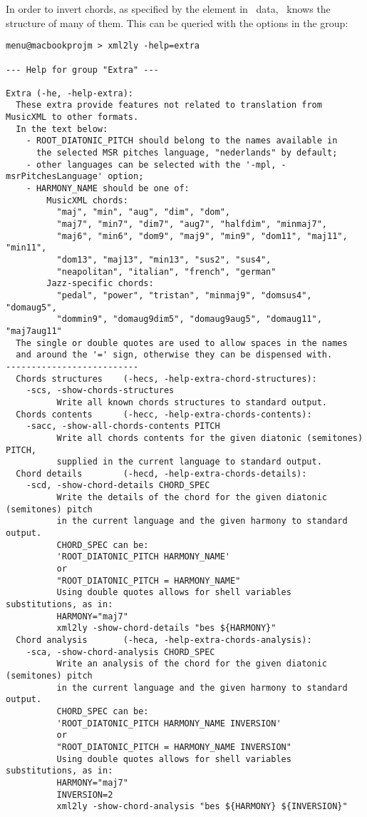 In order to invert chords, as specified by the  element in \mxml\ data, \mxmlToLy\ knows the structure of many of them. This can be queried with the options in the  group:
\begin{lstlisting}[language=MusicXML]
menu@macbookprojm > xml2ly -help=extra

--- Help for group "Extra" ---

Extra (-he, -help-extra):
  These extra provide features not related to translation from MusicXML to other formats.
  In the text below:
    - ROOT_DIATONIC_PITCH should belong to the names available in
      the selected MSR pitches language, "nederlands" by default;
    - other languages can be selected with the '-mpl, -msrPitchesLanguage' option;
    - HARMONY_NAME should be one of:
        MusicXML chords:
          "maj", "min", "aug", "dim", "dom",
          "maj7", "min7", "dim7", "aug7", "halfdim", "minmaj7",
          "maj6", "min6", "dom9", "maj9", "min9", "dom11", "maj11", "min11",
          "dom13", "maj13", "min13", "sus2", "sus4",
          "neapolitan", "italian", "french", "german"
        Jazz-specific chords:
          "pedal", "power", "tristan", "minmaj9", "domsus4", "domaug5",
          "dommin9", "domaug9dim5", "domaug9aug5", "domaug11", "maj7aug11"
  The single or double quotes are used to allow spaces in the names
  and around the '=' sign, otherwise they can be dispensed with.
--------------------------
  Chords structures    (-hecs, -help-extra-chord-structures):
    -scs, -show-chords-structures
          Write all known chords structures to standard output.
  Chords contents      (-hecc, -help-extra-chords-contents):
    -sacc, -show-all-chords-contents PITCH
          Write all chords contents for the given diatonic (semitones) PITCH,
          supplied in the current language to standard output.
  Chord details        (-hecd, -help-extra-chords-details):
    -scd, -show-chord-details CHORD_SPEC
          Write the details of the chord for the given diatonic (semitones) pitch
          in the current language and the given harmony to standard output.
          CHORD_SPEC can be:
          'ROOT_DIATONIC_PITCH HARMONY_NAME'
          or
          "ROOT_DIATONIC_PITCH = HARMONY_NAME"
          Using double quotes allows for shell variables substitutions, as in:
          HARMONY="maj7"
          xml2ly -show-chord-details "bes ${HARMONY}"
  Chord analysis       (-heca, -help-extra-chords-analysis):
    -sca, -show-chord-analysis CHORD_SPEC
          Write an analysis of the chord for the given diatonic (semitones) pitch
          in the current language and the given harmony to standard output.
          CHORD_SPEC can be:
          'ROOT_DIATONIC_PITCH HARMONY_NAME INVERSION'
          or
          "ROOT_DIATONIC_PITCH = HARMONY_NAME INVERSION"
          Using double quotes allows for shell variables substitutions, as in:
          HARMONY="maj7"
          INVERSION=2
          xml2ly -show-chord-analysis "bes ${HARMONY} ${INVERSION}"
\end{lstlisting}

